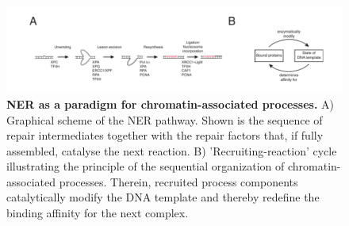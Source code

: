 \begin{figure}[t!]
	\begin{center}
		\includegraphics[width=1\textwidth]{Abbildungen/figure1_1.pdf}
		\caption{\textbf{NER as a paradigm for chromatin-associated processes.} A) Graphical scheme of the NER pathway. Shown is the sequence of repair intermediates together with the repair factors that, if fully assembled, catalyse the next reaction. B) 'Recruiting-reaction' cycle illustrating the principle of the sequential organization of chromatin-associated processes. Therein, recruited process components catalytically modify the DNA template and thereby redefine the binding affinity for the next complex.}
		\label{fig:introScheme}
	\end{center}
\end{figure} 

